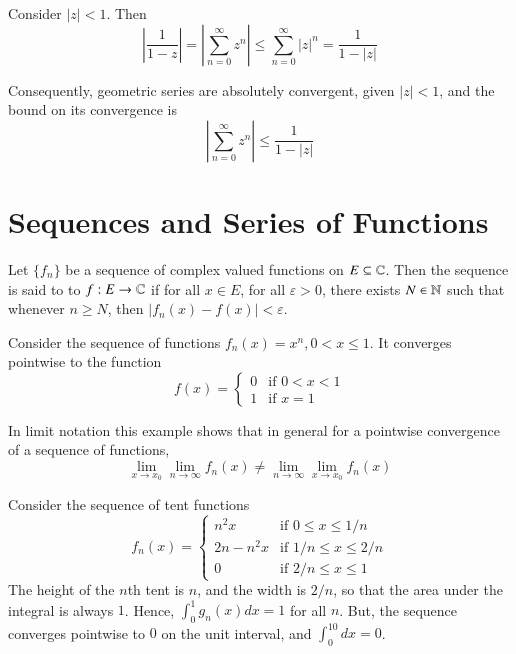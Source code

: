 \documentclass[12pt, a4paper, oneside, openright, titlepage]{book}
\begin{document}
\begin{eg}
    Consider $|z| < 1$. Then \begin{equation*}
        \left|\frac{1}{1-z}\right| = \left|\sum_{n=0}^{\infty}z^n\right| \leq \sum_{n=0}^{\infty}|z|^n = \frac{1}{1-|z|}
    \end{equation*}
\end{eg}

Consequently, geometric series are absolutely convergent, given $|z| < 1$, and the bound on its convergence is \begin{equation*}
    \left|\sum_{n=0}^{\infty}z^n\right| \leq \frac{1}{1-|z|}
\end{equation*}



\section{Sequences and Series of Functions}

\begin{defn}
    Let $\{f_n\}$ be a sequence of complex valued functions on $E \subseteq \mathbb C$. Then the sequence is said to  to $f:E\rightarrow \mathbb C$ if for all $x \in E$, for all $\varepsilon > 0$, there exists $N \in \mathbb N$ such that whenever $n \geq N$, then $|f_n(x) - f(x)| < \varepsilon$.
\end{defn}

\begin{eg}
    Consider the sequence of functions $f_n(x) = x^n, 0 < x \leq 1$. It converges pointwise to the function \begin{equation*}
        f(x) = \left\{\begin{array}{lc} 0 & \text{if } 0 < x < 1 \\ 1 & \text{if } x = 1\end{array}\right.
    \end{equation*}
\end{eg}

In limit notation this example shows that in general for a pointwise convergence of a sequence of functions, $$\lim\limits_{x\rightarrow x_0}\lim\limits_{n\rightarrow \infty}f_n(x) \neq \lim\limits_{n\rightarrow \infty}\lim\limits_{x\rightarrow x_0}f_n(x)$$

\begin{eg}
    Consider the sequence of tent functions \begin{equation*}
        f_n(x) = \left\{\begin{array}{lc} n^2x & \text{if } 0 \leq x \leq 1/n \\ 2n-n^2x & \text{if } 1/n \leq x \leq 2/n \\ 0 & \text{if } 2/n \leq x \leq 1 \end{array}\right.
    \end{equation*}
    The height of the $n$th tent is $n$, and the width is $2/n$, so that the area under the integral is always $1$. Hence, $\int_0^1g_n(x)dx = 1$ for all $n$. But, the sequence converges pointwise to $0$ on the unit interval, and $\int_0^10dx = 0$.
\end{eg}
\end{document}
